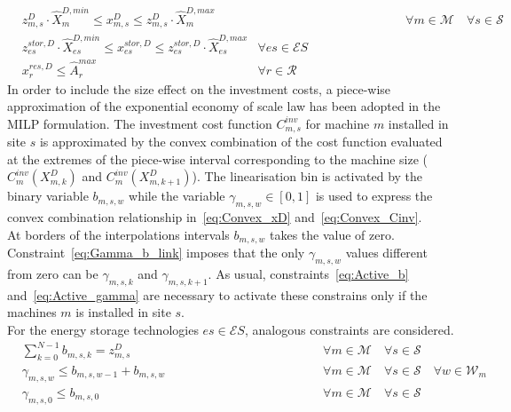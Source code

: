 \documentclass{article}
\newcommand{\cM}{{\mathcal M}}
\newcommand{\cS}{{\mathcal S}}
\newcommand{\cR}{{\mathcal R}}
\newcommand{\cES}{{\mathcal ES}}
\newcommand{\cW}{{\mathcal W}}
\begin{document}
{		\begin{align}
		& z_{m,s}^D \cdot \hat{X}_{m}^{D, min} \leq x_{m,s}^D \leq z_{m,s}^D \cdot \hat{X}_{m}^{D, max} &\hspace{5cm} \forall m \in \cM \quad \forall s \in \cS \label{eq:Size_lim} \\
		& z_{es}^{stor,D} \cdot \hat{X}_{es}^{D, min} \leq x_{es}^{stor,D} \leq z_{es}^{stor,D} \cdot \hat{X}_{es}^{D, max} & \forall es \in \cES \label{eq:Size_stor_max} \\
		& x_r^{res, D} \leq \hat{A}_r^{max} & \forall r \in \cR \label{eq:MaxArea_available}
		\end{align}
In order to include the size effect on the investment costs, a piece-wise approximation of the exponential economy of scale law has been adopted in the MILP formulation. The investment cost function $C_{m,s}^{inv}$ for machine $m$ installed in site $s$ is approximated by the convex combination of the cost function evaluated at the extremes of the piece-wise interval corresponding to the machine size ($C_{m}^{inv}(X_{m,k}^D)$ and $C_{m}^{inv}(X_{m,k+1}^D)$). 
The linearisation bin is activated by the binary variable $b_{m,s,w}$ while the variable $\gamma_{m,s,w} \in [0,1]$ is used to express the convex combination relationship in~\eqref{eq:Convex_xD} and~\eqref{eq:Convex_Cinv}. \\
At borders of the interpolations intervals $b_{m,s,w}$ takes the value of zero. Constraint~\eqref{eq:Gamma_b_link} imposes that the only $\gamma_{m,s,w}$ values different from zero can be $\gamma_{m,s,k}$ and $\gamma_{m,s,k+1}$. As usual, constraints~\eqref{eq:Active_b} and~\eqref{eq:Active_gamma} are necessary to activate these constrains only if the machines $m$ is installed in site $s$. \\
For the energy storage technologies $es \in \cES$, analogous constraints are considered. 
		\begin{align}
		& \sum_{ k = 0 }^{N-1} b_{m,s,k} = z_{m,s}^D & \hspace{5cm} \forall m \in \cM \quad \forall s \in \cS \label{eq:Active_b}\\
		& \gamma_{m,s,w} \leq b_{m,s,w-1} + b_{m,s,w}  & \hspace{5cm} \forall m \in \cM \quad \forall s \in \cS \quad \forall w \in \cW_m \label{eq:Gamma_b_link}\\
		& \gamma_{m,s,0} \leq b_{m,s,0}  & \hspace{5cm} \forall m \in \cM \quad \forall s \in \cS \label{eq:Gamma_b_zero}\\

\end{align}}
\end{document}
